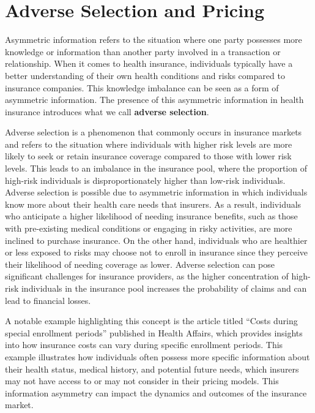 \documentclass[
  letterpaper,
  DIV=11,
  numbers=noendperiod]{scrreport}
\theoremstyle{definition}
\theoremstyle{remark}
\begin{document}
\hypertarget{adverse-selection-and-pricing}{%
\chapter{Adverse Selection and
Pricing}\label{adverse-selection-and-pricing}}

Asymmetric information refers to the situation where one party possesses
more knowledge or information than another party involved in a
transaction or relationship. When it comes to health insurance,
individuals typically have a better understanding of their own health
conditions and risks compared to insurance companies. This knowledge
imbalance can be seen as a form of asymmetric information. The presence
of this asymmetric information in health insurance introduces what we
call \textbf{adverse selection}.

Adverse selection is a phenomenon that commonly occurs in insurance
markets and refers to the situation where individuals with higher risk
levels are more likely to seek or retain insurance coverage compared to
those with lower risk levels. This leads to an imbalance in the
insurance pool, where the proportion of high-risk individuals is
disproportionately higher than low-risk individuals. Adverse selection
is possible due to asymmetric information in which individuals know more
about their health care needs that insurers. As a result, individuals
who anticipate a higher likelihood of needing insurance benefits, such
as those with pre-existing medical conditions or engaging in risky
activities, are more inclined to purchase insurance. On the other hand,
individuals who are healthier or less exposed to risks may choose not to
enroll in insurance since they perceive their likelihood of needing
coverage as lower. Adverse selection can pose significant challenges for
insurance providers, as the higher concentration of high-risk
individuals in the insurance pool increases the probability of claims
and can lead to financial losses.

A notable example highlighting this concept is the article titled
``Costs during special enrollment periods'' published in Health Affairs,
which provides insights into how insurance costs can vary during
specific enrollment periods. This example illustrates how individuals
often possess more specific information about their health status,
medical history, and potential future needs, which insurers may not have
access to or may not consider in their pricing models. This information
asymmetry can impact the dynamics and outcomes of the insurance market.
\end{document}
